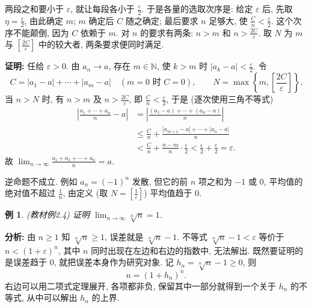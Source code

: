 \documentclass[UTF8,openany]{ctexbook}
\theoremstyle{chinesetextbook}
\newtheorem{example}{例}[section]
\newenvironment{cnproof}{\par\indent\textbf{证明:} \ignorespaces}{\par}
\begin{document}
两段之和要小于 $\varepsilon$, 就让每段各小于 $\displaystyle\frac\varepsilon2$. 于是各量的选取次序是: 给定 $\varepsilon$ 后, 先取 $\displaystyle\eta=\frac\varepsilon2$, 由此确定 $m$; $m$ 确定后 $C$ 随之确定; 最后要求 $n$ 足够大, 使 $\displaystyle\frac Cn<\frac\varepsilon2$. 这个次序不能颠倒, 因为 $C$ 依赖于 $m$. 对 $n$ 的要求有两条: $n>m$ 和 $\displaystyle n>\frac{2C}\varepsilon$. 取 $N$ 为 $m$ 与 $\displaystyle\left[\frac{2C}\varepsilon\right]$ 中的较大者, 两条要求便同时满足.
\begin{cnproof}
任给 $\varepsilon>0$. 由 $a_n\to a$, 存在 $m\in\mathbb N$, 使 $k>m$ 时 $\displaystyle|a_k-a|<\frac\varepsilon2$. 令
\[
C=|a_1-a|+\cdots+|a_m-a|\quad(m=0\text{ 时 }C=0),\qquad N=\max\left\{m,\left[\frac{2C}\varepsilon\right]\right\}.
\]
当 $n>N$ 时, 有 $n>m$ 及 $\displaystyle n>\frac{2C}\varepsilon$, 即 $\displaystyle\frac Cn<\frac\varepsilon2$, 于是 (逐次使用三角不等式)
\[
\begin{aligned}
\left|\frac{a_1+\cdots+a_n}n-a\right|
&=\left|\frac{(a_1-a)+\cdots+(a_n-a)}n\right|\\
&\le\frac Cn+\frac{|a_{m+1}-a|+\cdots+|a_n-a|}n\\
&<\frac Cn+\frac{n-m}n\cdot\frac\varepsilon2
<\frac\varepsilon2+\frac\varepsilon2=\varepsilon.
\end{aligned}
\]
故 $\displaystyle\lim_{n\to\infty}\frac{a_1+a_2+\cdots+a_n}n=a$.
\end{cnproof}
逆命题不成立. 例如 $a_n=(-1)^n$ 发散, 但它的前 $n$ 项之和为 $-1$ 或 $0$, 平均值的绝对值不超过 $\displaystyle\frac1n$, 由定义 (取 $\displaystyle N=\left[\frac1\varepsilon\right]$) 平均值趋于 $0$.
\begin{example}\label{ex:2-4}
\textnormal{(教材例2.4)} 证明 $\displaystyle\lim_{n\to\infty}\sqrt[n]n=1$.
\end{example}
\par\indent\textbf{分析:} 由 $n\ge1$ 知 $\sqrt[n]n\ge1$, 误差就是 $\sqrt[n]n-1$. 不等式 $\sqrt[n]n-1<\varepsilon$ 等价于 $n<(1+\varepsilon)^n$, 其中 $n$ 同时出现在左边和右边的指数中, 无法解出. 既然要证明的是误差趋于 $0$, 就把误差本身作为研究对象. 记 $h_n=\sqrt[n]n-1\ge0$, 则
\[
n=(1+h_n)^n.
\]
右边可以用二项式定理展开, 各项都非负, 保留其中一部分就得到一个关于 $h_n$ 的不等式, 从中可以解出 $h_n$ 的上界.
\end{document}
